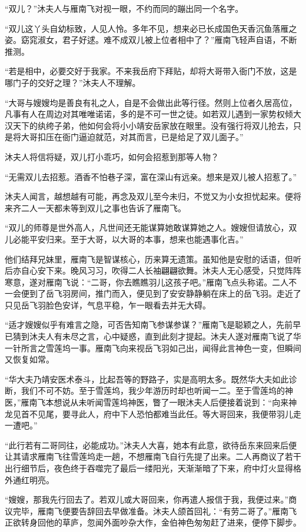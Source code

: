 “双儿？”沐夫人与雁南飞对视一眼，不约而同的蹦出同一个名字。

“双儿这丫头自幼标致，人见人怜。多年不见，想来必已长成国色天香沉鱼落雁之姿。窈窕淑女，君子好逑。难不成双儿被上位者相中了？”雁南飞轻声自语，不断推测。

“若是相中，必要交好于我家。不来我岳府下拜贴，却将大哥带入衙门不放，这是哪门子的交好之理？”沐夫人不理解。

“大哥与嫂嫂均是善良有礼之人，自是不会做出此等行径。然则上位者久居高位，凡事有人在周边对其唯唯诺诺，多的是不可一世之徒。如若双儿遇到一家势权倾大汉天下的纨绔子弟，他如何会将小小靖安岳家放在眼里。没有强行将双儿抢去，只是将大哥扣压在衙门逼迫就范，对其而言，已是给足了双儿面子。”

沐夫人将信将疑，双儿打小乖巧，如何会招惹到那等人物？

“无需双儿去招惹。酒香不怕巷子深，富在深山有远亲。想来是双儿被人招惹了。”

沐夫人闻言，越想越有可能，再念及双儿至今未归，不觉又为小女担忧起来。便将来齐二人一天都未等到双儿之事也告诉了雁南飞。

“双儿的师尊是世外高人，凡世间还无能谋算她敢谋算她之人。嫂嫂但请放心，双儿必能平安归来。至于大哥，以大哥的本事，想来也能遇事化吉。”

他们结拜兄妹里，雁南飞是智谋核心，历来算无遗策。虽知他是安慰的话语，但听后亦自心安下来。晚风习习，吹得二人长袖翩翩欲舞。沐夫人无心感受，只觉阵阵寒意，遂对雁南飞说：“二哥，你去瞧瞧羽儿这孩子吧。”雁南飞点头称诺。二人不一会便到了岳飞羽房间，推门而入，便见到了安安静静躺在床上的岳飞羽。走近了只见岳飞羽脸色安详，气息平稳，乍一眼看去并无大碍。

“适才嫂嫂似乎有难言之隐，可否告知南飞参谋参谋？”雁南飞是聪颖之人，先前早已猜到沐夫人有未尽之言，心中疑惑，直到此刻才提起。沐夫人遂对雁南飞说了华一针所言之雪莲坞一事。雁南飞向来视岳飞羽如己出，闻得此言神色一变，但瞬间又恢复如常。

“华大夫乃靖安医术泰斗，比起吾等的野路子，实是高明太多。既然华大夫如此诊断，我们不可不妨。至于雪莲坞，我少年游历时却也听闻一二。至于雪莲坞的神医，”雁南飞本想说从未听闻雪莲坞神医，瞥了一眼沐夫人后便接着说到：“向来神龙见首不见尾，要寻此人，府中下人恐怕都难当此任。等大哥回来，我便带羽儿走一遭吧。”

“此行若有二哥同往，必能成功。”沐夫人大喜，她本有此意，欲待岳东来回来后便让其请求雁南飞往雪莲坞走一趟，不想雁南飞自行先提了出来。二人再商议了若干出行细节后，夜色终于吞噬完了最后一缕阳光，天渐渐暗了下来，府中灯火显得格外通红明亮。

“嫂嫂，那我先行回去了。若双儿或大哥回来，你再遣人报信于我，我便过来。”商议完毕，雁南飞便要告辞回去早做准备。沐夫人颌首回礼：“有劳二哥了。”雁南飞正欲转身回他的草庐，忽闻外面吵杂大作，金伯神色匆匆赶了进来，便停下脚步。

